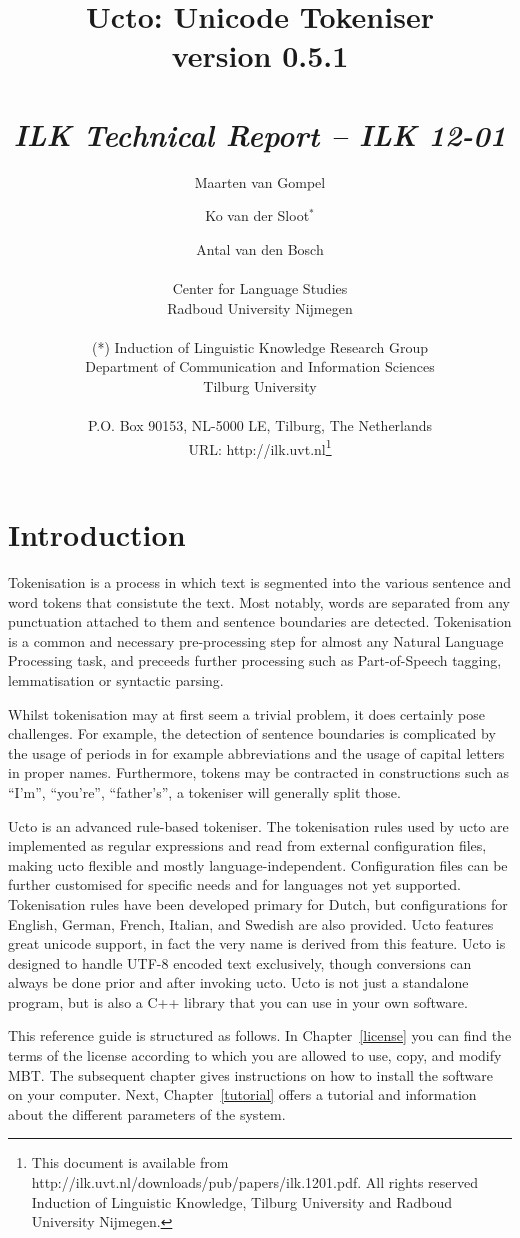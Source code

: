 \documentclass{report}
\author{Maarten van Gompel \and Ko van der Sloot$^*$ \and
	Antal van den Bosch \\ \ \\
	Center for Language Studies \\
	Radboud University Nijmegen \\ \\

	(*) Induction of Linguistic Knowledge Research Group\\
	Department of Communication and Information Sciences\\ 
        Tilburg University \\ \\
             
        P.O. Box 90153, NL-5000 LE, Tilburg, The Netherlands \\ 
        URL: http://ilk.uvt.nl\thanks{This document is available from
	http://ilk.uvt.nl/downloads/pub/papers/ilk.1201.pdf. All rights reserved
	Induction of Linguistic Knowledge, Tilburg University and 
        Radboud University Nijmegen.}}
\title{{\huge Ucto: Unicode Tokeniser} \\ \vspace*{0.5cm}
{\bf version 0.5.1} \\ \vspace*{0.5cm}{\huge Reference Guide}\\
\vspace*{1cm} {\it ILK Technical Report -- ILK 12-01}}
\begin{document}

\maketitle

\tableofcontents

\chapter*{Introduction}

Tokenisation is a process in which text is segmented into the various sentence and word tokens that consistute the text. Most notably, words are separated from any punctuation attached to them and sentence boundaries are detected. Tokenisation is a common and necessary pre-processing step for almost any Natural Language Processing task, and preceeds further processing such as Part-of-Speech tagging, lemmatisation or syntactic parsing. 

Whilst tokenisation may at first seem a trivial problem, it does certainly pose challenges. For example, the detection of sentence boundaries is complicated by the usage of periods in for example abbreviations and the usage of capital letters in proper names. Furthermore, tokens may be contracted in constructions such as ``I'm'', ``you're'', ``father's'', a tokeniser will generally split those.

Ucto is an advanced rule-based tokeniser. The tokenisation rules used by ucto are implemented as regular expressions and read from external configuration files, making ucto flexible and mostly language-independent. Configuration files can be further customised for specific needs and for languages not yet supported. Tokenisation rules have been developed primary for Dutch, but configurations for English, German, French, Italian, and Swedish are also provided. Ucto features great unicode support, in fact the very name is derived from this feature. Ucto is designed to handle UTF-8 encoded text exclusively, though conversions can always be done prior and after invoking ucto. Ucto is not just a standalone program, but is also a C++ library that you can use in your own software. 

This reference guide is structured as follows. In Chapter~\ref{license} you can find the terms of the license according to which you are allowed to use, copy, and modify MBT. The subsequent chapter gives instructions on how to install the software on your computer.  Next, Chapter~\ref{tutorial} offers a tutorial and information about the different parameters of the system. 
\end{document}
